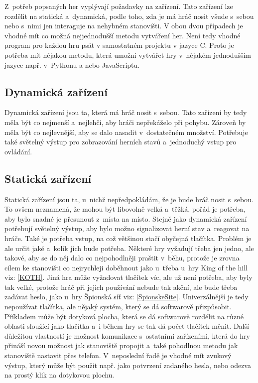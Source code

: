 Z~potřeb popsaných her vyplývají požadavky na zařízení.
Tato zařízení lze rozdělit na statická a~dynamická, podle toho, zda je má hráč nosit všude s~sebou nebo s~nimi jen interaguje na nehybném stanovišti.
V obou dvou případech je vhodné mít co možná nejjednodušší metodu vytváření her.
Není tedy vhodné program pro každou hru psát v samostatném projektu v jazyce C.
Proto je potřeba mít nějakou metodu, která umožní vytvářet hry v~nějakém jednodušším jazyce např. v~Pythonu a nebo JavaScriptu.

\subsection{Dynamická zařízení}
Dynamická zařízení jsou ta, která má hráč nosit s~sebou.
Tato zařízení by tedy měla být co nejmenší a~nejlehčí, aby hráči nepřekáželo při pohybu.
Zároveň by měla být co nejlevnější, aby se dalo nasadit v~dostatečném množství.
Potřebuje také světelný výstup pro zobrazování herních stavů a~jednoduchý vstup pro ovládání. 

\subsection{Statická zařízení}
Statická zařízení jsou ta, u~nichž nepředpokládám, že je bude hráč nosit s~sebou.
To ovšem neznamená, že mohou být libovolně velká a~těžká, pořád je potřeba, aby bylo snadné je přesunout z~místa na místo.
Stejně jako dynamická zařízení potřebují světelný výstup, aby bylo možno signalizovat herní stav a~reagovat na hráče.
Také je potřeba vstup, na což většinou stačí obyčejná tlačítka.
Problém je ale určit jaké a~kolik jich bude potřeba.
Některé hry vyžadují třeba jen jedno, ale takové, aby se do něj dalo co nejpohodlněji praštit v~běhu, protože je zrovna cílem ke stanovišti co nejrychleji doběhnout jako u~třeba u~hry King of the hill {viz: \ref{KOTH}}.
Jiná hra může vyžadovat tlačítek víc, ale už není potřeba, aby byly tak velké, protože hráč při jejich používání nebude tak akční, ale bude třeba zadávat heslo, jako u~hry Špionská síť {viz: \ref{SpionskeSite}}.
Univerzálnější je tedy nepoužívat tlačítka, ale nějaký systém, který se dá softwarově přizpůsobit.
Příkladem může být dotyková plocha, která se dá softwarově rozdělit na různé oblasti sloužící jako tlačítka a~i během hry se tak dá počet tlačítek měnit.
Další důležitou vlastností je možnost komunikace s~ostatními zařízeními, která do hry přináší novou možnost jak stanoviště propojit a~také pohodlnou metodu jak stanoviště nastavit přes telefon.
V~neposlední řadě je vhodné mít zvukový výstup, který může být použit např. jako potvrzení zadaného hesla, nebo odezva na prostý klik na dotykovou plochu.

